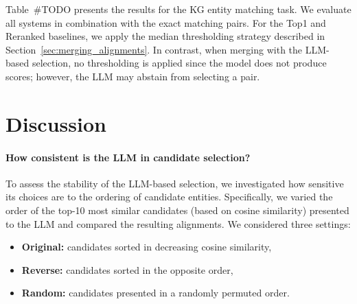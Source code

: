 \documentclass[11pt]{article}
\begin{document}
Table~\#TODO presents the results for the KG entity matching task. 
We evaluate all systems in combination with the exact matching pairs. For the Top1 and Reranked baselines, we apply the median thresholding strategy described in Section~\ref{sec:merging_alignments}. 
In contrast, when merging with the LLM-based selection, no thresholding is applied since the model does not produce scores; however, the LLM may abstain from selecting a pair.



\section{Discussion}

\paragraph{How consistent is the LLM in candidate selection?}
To assess the stability of the LLM-based selection, we investigated how sensitive its choices are to the ordering of candidate entities. Specifically, we varied the order of the top-10 most similar candidates (based on cosine similarity) presented to the LLM and compared the resulting alignments. We considered three settings:
\begin{itemize}[nosep]
\setlength\itemsep{0em}
\setlength\parskip{0em}
\setlength\parsep{0em}
\item \textbf{Original:} candidates sorted in decreasing cosine similarity,
\item \textbf{Reverse:} candidates sorted in the opposite order,
\item \textbf{Random:} candidates presented in a randomly permuted order.
\end{itemize}
\end{document}
